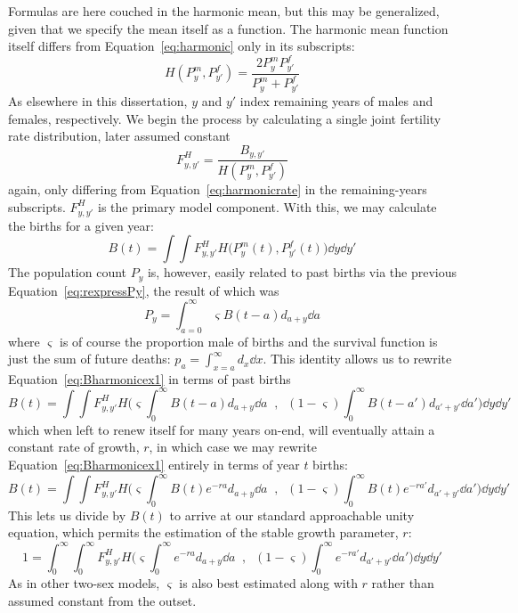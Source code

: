  \FloatBarrier
Formulas are here couched in the harmonic
mean, but this may be generalized, given that we specify the mean itself as
a function. The harmonic mean function itself differs from
Equation~\eqref{eq:harmonic} only in its subscripts:
\begin{equation}
H(P_y^m, P_{y'}^f) = \frac{2 P_y^m P_{y'}^f}{P_y^m + P_{y'}^f}
\end{equation}
As elsewhere in this dissertation, $y$ and $y'$ index remaining years of
males and females, respectively. We begin the process by calculating a single
joint fertility rate distribution, later assumed constant
 \begin{equation}
 F_{y,y'}^H = \frac{B_{y,y'}}{H(P_y^m, P_{y'}^f)}
 \end{equation}
again, only differing from Equation~\eqref{eq:harmonicrate} in the 
remaining-years subscripts. $F_{y,y'}^H$ is the primary model component. With this, we may
calculate the births for a given year:
 \begin{equation}
 \label{eq:Bharmonicex1}
 B(t) = \int \int F_{y,y'}^H H\Big(P_{y}^m(t), P_{y'}^f(t)\Big) \dd y \dd
 y'
 \end{equation}
The population count $P_y$ is, however, easily related to past births via the
previous Equation~\eqref{eq:rexpressPy}, the result of which was
\begin{equation}
P_y = \int_{a=0}^\infty \varsigma B(t-a)d_{a+y} \dd a
\end{equation}
 where $\varsigma$ is of course the proportion
male of births and the survival function is just the sum of future deaths: $p_a
= \int _{x=a}^\infty d_x \dd x$. This identity allows us to rewrite
Equation~\eqref{eq:Bharmonicex1} in terms of past births
 \begin{equation}
 \label{eq:Bharmonicex1}
 B(t) = \int \int F_{y,y'}^H H\Bigg(\varsigma \int _0^\infty B(t-a)d_{a+y}\dd
 a\;\;,\;\; (1-\varsigma) \int _0^\infty B(t-a')d_{a'+y'} \dd a'\Bigg) \dd y \dd
 y'
 \end{equation}
which when left to renew itself for many years on-end, will eventually attain a
constant rate of growth, $r$, in which case we may rewrite
Equation~\eqref{eq:Bharmonicex1} entirely in terms of year $t$ births:
 \begin{equation}
 \label{eq:Bharmonicex2}
 B(t) = \int \int F_{y,y'}^H H\Bigg(\varsigma \int _0^\infty
 B(t)e^{-ra}d_{a+y}\dd a\;\;,\;\; (1-\varsigma) \int _0^\infty
 B(t)e^{-ra'}d_{a'+y'} \dd a'\Bigg) \dd y \dd y'
 \end{equation}
This lets us divide by $B(t)$ to arrive at our standard approachable unity
equation, which permits the estimation of the stable growth parameter, $r$:
 \begin{equation}
 \label{eq:exMeanUnity}
 1 = \int_0^\infty \int_0^\infty F_{y,y'}^H H\Bigg(\varsigma \int _0^\infty
 e^{-ra}d_{a+y}\dd a\;\;,\;\; (1-\varsigma) \int _0^\infty
 e^{-ra'}d_{a'+y'} \dd a'\Bigg) \dd y \dd y'
 \end{equation}
As in other two-sex models, $\varsigma$ is also best estimated along with $r$
rather than assumed constant from the outset.
 \FloatBarrier
